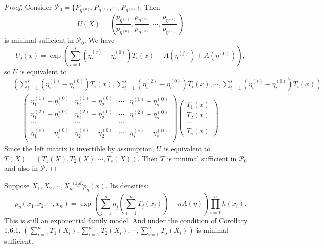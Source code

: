 \documentclass[a4paper]{article}
\begin{document}
\begin{proof}
	Consider $\mathcal{P}_0=\{P_{\eta^{(0)}},P_{\eta^{(1)}},\cdots,P_{\eta^{(s)}}\}$. Then
	\begin{equation}
		U(X) = \left(\frac{p_{\eta^{(1)}}}{p_{\eta^{(0)}}},\frac{p_{\eta^{(2)}}}{p_{\eta^{(0)}}},\cdots,\frac{p_{\eta^{(s)}}}{p_{\eta^{(0)}}}\right)
	\end{equation}
	is minimal sufficient in $\mathcal{P}_0$. We have
	\begin{equation}
		U_j(x)=\exp\left(\sum\limits_{i=1}^s (\eta_i^{(j)}-\eta_i^{(0)})T_i(x)-A(\eta^{(j)})+A(\eta^{(0)})\right),
	\end{equation}
	so $U$ is equivalent to
	\begin{equation}
		\begin{aligned}
			&\left(\sum\limits_{i=1}^s \left(\eta_i^{(1)}-\eta_i^{(0)}\right)T_i(x),\sum\limits_{i=1}^s \left(\eta_i^{(2)}-\eta_i^{(0)}\right)T_i(x),\cdots,\sum\limits_{i=1}^s \left(\eta_i^{(s)}-\eta_i^{(0)}\right)T_i(x)\right) \\
			&= 
			\begin{pmatrix}
				\eta_1^{(1)}-\eta_1^{(0)} & \eta_2^{(1)}-\eta_2^{(0)} & \cdots & \eta_s^{(1)}-\eta_s^{(0)} \\
				\eta_1^{(2)}-\eta_1^{(0)} & \eta_2^{(2)}-\eta_2^{(0)} & \cdots & \eta_s^{(2)}-\eta_s^{(0)} \\
				\cdots & \cdots & \cdots \\
			\eta_1^{(s)}-\eta_1^{(0)} & \eta_2^{(s)}-\eta_2^{(0)} & \cdots & \eta_s^{(s)}-\eta_s^{(0)} \\
			\end{pmatrix}
			\begin{pmatrix}
				T_1(x) \\ T_2(x) \\ \cdots \\ T_s(x)
			\end{pmatrix}
		\end{aligned}
	\end{equation}
	Since the left matrix is invertible by assumption, $U$ is equivalent to $T(X)=(T_1(X),T_2(X),\cdots,T_s(X))$. Then $T$ is minimal sufficient in $\mathcal{P}_0$ and also in $\mathcal{P}$.
\end{proof}

\begin{cor}
	Suppose $X_1,X_2,\cdots,X_n \stackrel{i.i.d.}{\sim} p_\eta(x)$. Its densities:
	\begin{equation*}
		p_\eta(x_1,x_2,\cdots,x_n) = \exp\left(\sum\limits_{j=1}^s\eta_j\left(\sum\limits_{i=1}^n T_j(x_i)\right)-nA(\eta)\right)\prod \limits_{i=1}^nh(x_i).
	\end{equation*}
	This is still an exponential family model. And under the condition of Corollary 1.6.1, $\left(\sum\limits_{i=1}^n T_1(X_i) ,\sum\limits_{i=1}^n T_2(X_i),\cdots,\sum\limits_{i=1}^n T_s(X_i)\right)$ is minimal sufficient.
\end{cor}
\end{document}
